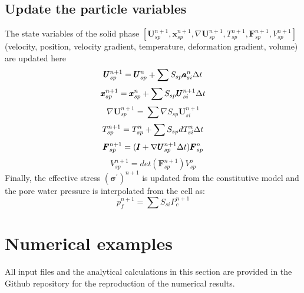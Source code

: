 \documentclass[preprint,12pt]{elsarticle}
\begin{document}
\subsection{\textsf{Update the particle variables}}
%
%
The state variables of the solid phase $[\pmb{U}_{sp}^{n+1},\pmb{x}_{sp}^{n+1},\nabla \pmb{U}_{sp}^{n+1}, T_{sp}^{n+1}, \pmb{F}_{sp}^{n+1},V_{sp}^{n+1}]$ (velocity, position, velocity gradient, temperature, deformation gradient, volume) are updated here 
%
%
\begin{equation}
     \pmb{U}_{sp}^{n+1} = \pmb{U}_{sp}^n + \sum{S_{sp} \pmb{a}_{si}^n \ensuremath{\Delta{t}} } 
\end {equation}
%
%
\begin{equation}
     \pmb{x}_{sp}^{n+1} = \pmb{x}_{sp}^n + \sum{S_{sp} \pmb{U}_{si}^{n+1} \ensuremath{\Delta{t}} } 
\end {equation}
%
%
\begin{equation}
    \nabla \pmb{U}_{sp}^{n+1} = \sum{\nabla S_{sp} \pmb{U}_{si}^{n+1}} 
\end {equation}
%
%
\begin{equation}
     T_{sp}^{n+1} = T_{sp}^n + \sum{S_{sp} dT_{si}^n \ensuremath{\Delta{t}} } 
\end {equation}
%
%
\begin{equation}
     \pmb{F}_{sp}^{n+1} = (\pmb{I} + \nabla \pmb{U}_{sp}^{n+1} \Delta{t})\pmb{F}_{sp}^n
\end {equation}
%
%
\begin{equation}
     V_{sp}^{n+1} = det(\pmb{F}_{sp}^{n+1}) V_{sp}^o
\end {equation}
%
%
Finally, the effective stress $(\pmb{\sigma}^\prime)^{n+1}$ is updated from the constitutive model and the pore water pressure is interpolated from the cell as:
%
%
\begin{equation}
     p_{f}^{n+1} = \sum{S_{si} P_{c}^{n+1}} 
\end {equation}
%
%
\section{\textsf{Numerical examples}}
All input files and the analytical calculations in this section are provided in the Github repository for the reproduction of the numerical results.\\
\end{document}
